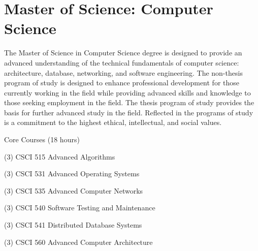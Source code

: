 %
\section*{Master of Science: Computer Science}

The Master of Science in Computer Science degree is designed to provide an advanced understanding of the technical fundamentals of computer science: architecture, database, networking, and software engineering. The non-thesis program of study is designed to enhance professional development for those currently working in the field while providing advanced skills and knowledge to those seeking employment in the field. The thesis program of study provides the basis for further advanced study in the field. Reflected in the programs of study is a commitment to the highest ethical, intellectual, and social values.

\begin{reqgroup}{Core Courses (18 hours)}
\begin{checklist}
\begin{minipage}[t]{0.5\linewidth}
	\item (3) CSCI 515  Advanced Algorithms
	\item (3) CSCI 531  Advanced Operating Systems
	\item (3) CSCI 535  Advanced Computer Networks
\end{minipage}
\begin{minipage}[t]{0.5\linewidth}
	\item (3) CSCI 540  Software Testing and Maintenance
	\item (3) CSCI 541  Distributed Database Systems
	\item (3) CSCI 560  Advanced Computer Architecture
\end{minipage}
\end{checklist}
\end{reqgroup}


